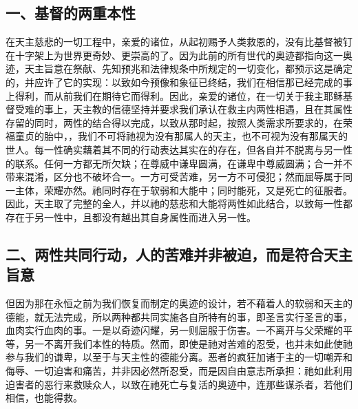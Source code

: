 \par


\subsection{一、基督的两重本性}

在天主慈悲的一切工程中，亲爱的诸位，从起初赐予人类救恩的，没有比基督被钉在十字架上为世界更奇妙、更崇高的了。因为此前的所有世代的奥迹都指向这一奥迹，天主旨意在祭献、先知预兆和法律规条中所规定的一切变化，都预示这是确定的，并应许了它的实现：以致如今预像和象征已终结，我们在相信那已经完成的事上得利，而从前我们在期待它而得利。因此，亲爱的诸位，在一切关于我主耶稣基督受难的事上，天主教的信德坚持并要求我们承认在救主内两性相遇，且在其属性存留的同时，两性的结合得以完成，以致从那时起，按照人类需求所要求的，在荣福童贞的胎中，，我们不可将祂视为没有那属人的天主，也不可视为没有那属天的世人。每一性确实藉着其不同的行动表达其实在的存在，但各自并不脱离与另一性的联系。任何一方都无所欠缺；在尊威中谦卑圆满，在谦卑中尊威圆满；合一并不带来混淆，区分也不破坏合一。一方可受苦难，另一方不可侵犯；然而屈辱属于同一主体，荣耀亦然。祂同时存在于软弱和大能中；同时能死，又是死亡的征服者。因此，天主取了完整的全人，并以祂的慈悲和大能将两性如此结合，以致每一性都存在于另一性中，且都没有越出其自身属性而进入另一性。\par


\subsection{二、两性共同行动，人的苦难并非被迫，而是符合天主旨意}

但因为那在永恒之前为我们恢复而制定的奥迹的设计，若不藉着人的软弱和天主的德能，就无法完成，所以两种都共同实施各自所特有的事，即圣言实行圣言的事，血肉实行血肉的事。一是以奇迹闪耀，另一则屈服于伤害。一不离开与父荣耀的平等，另一不离开我们本性的特质。然而，即使是祂对苦难的忍受，也并未如此使祂参与我们的谦卑，以至于与天主性的德能分离。恶者的疯狂加诸于主的一切嘲弄和侮辱、一切迫害和痛苦，并非因必然所忍受，而是因自由意志所承担：祂如此利用迫害者的恶行来救赎众人，以致在祂死亡与复活的奥迹中，连那些谋杀者，若他们相信，也能得救。\par

